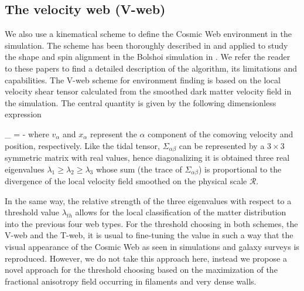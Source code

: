 \documentclass[a4,useAMS,usenatbib,usegraphicx]{latex/mn2e}
\begin{document}
\subsection{The velocity web (V-web)}
\label{subsec:Vweb}


We also use a kinematical scheme to define the Cosmic Web environment in 
the simulation. The scheme has been thoroughly described in 
\citet{Hoffman12} and applied to study the shape and spin alignment in the
Bolshoi simulation in \citet{Libeskind13}. We refer the reader to these 
papers to find a detailed description of the algorithm, its limitations 
and capabilities. The V-web scheme for environment finding is based on the
local velocity shear tensor calculated from the smoothed dark matter 
velocity field in the simulation. The central quantity is given by the 
following dimensionless expression


{	\Sigma_{\alpha\beta} = -	}
where $v_{\alpha}$ and $x_{\alpha}$ represent the $\alpha$ component of 
the comoving velocity and position, respectively. Like the tidal tensor, 
$\Sigma_{\alpha\beta}$ can be represented by a $3\times 3$ symmetric 
matrix with real values, hence diagonalizing it is obtained three real 
eigenvalues $\lambda_{1}\geq\lambda_{2}\geq\lambda_3$ whose sum (the 
trace of $\Sigma_{\alpha\beta}$) is proportional to the divergence of the 
local velocity field smoothed on the physical scale ${\mathcal R}$. 


In the same way, the relative strength of the three eigenvalues with 
respect to a threshold value $\lambda_{th}$ allows for the local 
classification of the matter distribution into the previous four web types. 
For the threshold choosing in both schemes, the V-web and the T-web, it is
usual to fine-tuning the value in such a way that the visual appearance of
the Cosmic Web as seen in simulations and galaxy surveys is reproduced. 
However, we do not take this approach here, instead we propose a novel 
approach for the threshold choosing based on the maximization of the 
fractional anisotropy field occurring in filaments and very dense walls.
\end{document}
